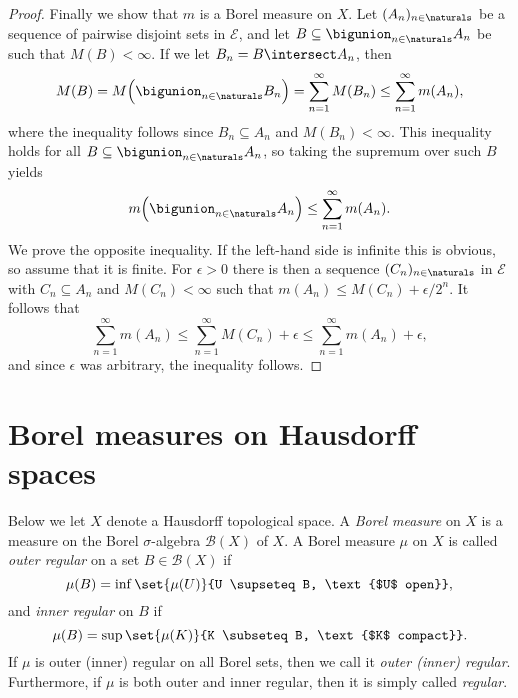 \documentclass[article, a4paper, 11pt, oneside]{memoir}
\numberwithin{equation}{chapter}
\newcommand{\calB}{\mathcal{B}}
\newcommand{\calE}{\mathcal{E}}
\newcommand{\borel}[1]{\calB(#1)}
\begin{document}
\begin{proof}
    Finally we show that $m$ is a Borel measure on $X$. Let $(A_n)_{n \in \naturals}$ be a sequence of pairwise disjoint sets in $\calE$, and let $B \subseteq \bigunion_{n \in \naturals} A_n$ be such that $M(B) < \infty$. If we let $B_n = B \intersect A_n$, then
    \begin{equation*}
        M(B)
            = M \Bigl( \bigunion_{n \in \naturals} B_n \Bigr)
            = \sum_{n=1}^\infty M(B_n)
            \leq \sum_{n=1}^\infty m(A_n),
    \end{equation*}
    where the inequality follows since $B_n \subseteq A_n$ and $M(B_n) < \infty$. This inequality holds for all $B \subseteq \bigunion_{n \in \naturals} A_n$, so taking the supremum over such $B$ yields
    \begin{equation*}
        m \Bigl( \bigunion_{n \in \naturals} A_n \Bigr)
            \leq \sum_{n=1}^\infty m(A_n).
    \end{equation*}
    We prove the opposite inequality. If the left-hand side is infinite this is obvious, so assume that it is finite. For $\epsilon > 0$ there is then a sequence $(C_n)_{n \in \naturals}$ in $\calE$ with $C_n \subseteq A_n$ and $M(C_n) < \infty$ such that $m(A_n) \leq M(C_n) + \epsilon/2^n$. It follows that
    \begin{equation*}
        \sum_{n=1}^\infty m(A_n)
            \leq \sum_{n=1}^\infty M(C_n) + \epsilon
            \leq \sum_{n=1}^\infty m(A_n) + \epsilon,
    \end{equation*}
    and since $\epsilon$ was arbitrary, the inequality follows.
\end{proof}


\section{Borel measures on Hausdorff spaces}

Below we let $X$ denote a Hausdorff topological space. A \emph{Borel measure} on $X$ is a measure on the Borel $\sigma$-algebra $\borel{X}$ of $X$. A Borel measure $\mu$ on $X$ is called \emph{outer regular} on a set $B \in \borel{X}$ if
%
\begin{equation*}
    \mu(B)
        = \inf \set{\mu(U)}{U \supseteq B, \text{$U$ open}},
\end{equation*}
%
and \emph{inner regular} on $B$ if
%
\begin{equation*}
    \mu(B)
        = \sup \set{\mu(K)}{K \subseteq B, \text{$K$ compact}}.
\end{equation*}
%
If $\mu$ is outer (inner) regular on all Borel sets, then we call it \emph{outer (inner) regular}. Furthermore, if $\mu$ is both outer and inner regular, then it is simply called \emph{regular}.
\end{document}
